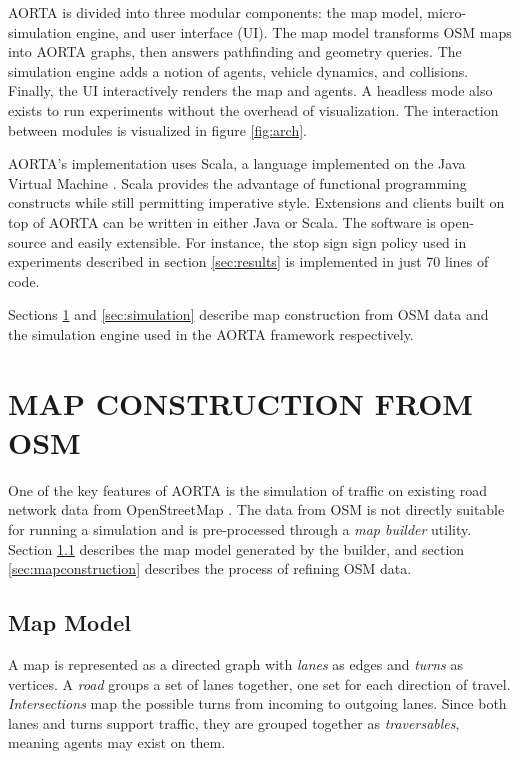 \documentclass[letterpaper, 10 pt, conference]{ieeeconf}  %
\begin{document}
AORTA is divided into three modular components: the map model, micro-simulation
engine, and user interface (UI). The map model transforms OSM maps into AORTA
graphs, then answers pathfinding and geometry queries. The simulation engine
adds a notion of agents, vehicle dynamics, and collisions. Finally, the UI
interactively renders the map and agents. A headless mode also exists to run
experiments without the overhead of visualization. The interaction between
modules is visualized in figure \ref{fig:arch}.

AORTA's implementation uses Scala, a language implemented on the Java Virtual
Machine \cite{scala}. Scala provides the advantage of functional programming
constructs while still permitting imperative style.  Extensions and clients
built on top of AORTA can be written in either Java or Scala. The software is
open-source and easily extensible. For instance, the stop sign sign policy used
in experiments described in section \ref{sec:results} is implemented in just 70
lines of code. 

Sections \ref{sec:map} and \ref{sec:simulation} describe map construction from
OSM data and the simulation engine used in the AORTA framework respectively.


\section{MAP CONSTRUCTION FROM OSM}
\label{sec:map}

One of the key features of AORTA is the simulation of traffic on existing road
network data from OpenStreetMap \cite{osm}. The data from OSM is not directly
suitable for running a simulation and is pre-processed through a \emph{map
builder} utility. Section \ref{sec:mapmodel} describes the map model generated
by the builder, and section \ref{sec:mapconstruction} describes the process of
refining OSM data.

\subsection{Map Model}
\label{sec:mapmodel}

A map is represented as a directed graph with \emph{lanes} as edges and
\emph{turns} as vertices. A \emph{road} groups a set of lanes together, one set
for each direction of travel. \emph{Intersections} map the possible turns from
incoming to outgoing lanes.  Since both lanes and turns support traffic, they
are grouped together as \emph{traversables}, meaning agents may exist on them.
\end{document}
